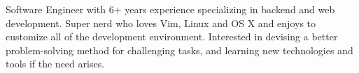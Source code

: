 

\begin{cvparagraph}

Software Engineer with 6+ years experience specializing in backend and web development. Super nerd who loves Vim, Linux and OS X and enjoys to customize all of the development environment. Interested in devising a better problem-solving method for challenging tasks, and learning new technologies and tools if the need arises.
\end{cvparagraph}
